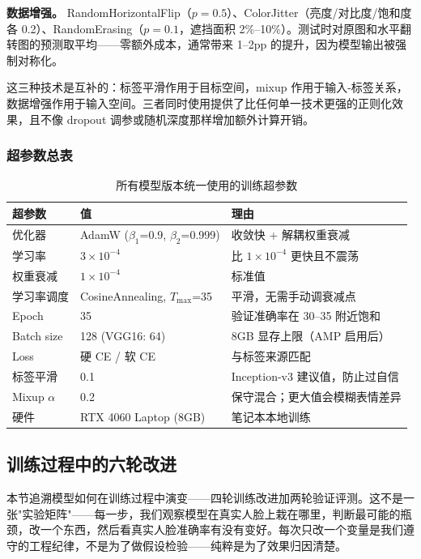 \documentclass[12pt,a4paper]{ctexart}
\begin{document}
\textbf{数据增强。} RandomHorizontalFlip（$p=0.5$）、ColorJitter（亮度/对比度/饱和度各 0.2）、RandomErasing（$p=0.1$，遮挡面积 2\%--10\%）。测试时对原图和水平翻转图的预测取平均——零额外成本，通常带来 1--2pp 的提升，因为模型输出被强制对称化。

这三种技术是互补的：标签平滑作用于目标空间，mixup 作用于输入-标签关系，数据增强作用于输入空间。三者同时使用提供了比任何单一技术更强的正则化效果，且不像 dropout 调参或随机深度那样增加额外计算开销。

\subsubsection{超参数总表}

\begin{table}[H]
\centering
\caption{所有模型版本统一使用的训练超参数}
\begin{tabular}{lll}
\toprule
超参数 & 值 & 理由 \\
\midrule
优化器    & AdamW ($\beta_1$=0.9, $\beta_2$=0.999) & 收敛快 + 解耦权重衰减 \\
学习率    & $3\times10^{-4}$ & 比 $1\times10^{-4}$ 更快且不震荡 \\
权重衰减  & $1\times10^{-4}$ & 标准值 \\
学习率调度 & CosineAnnealing, $T_{\max}$=35 & 平滑，无需手动调衰减点 \\
Epoch    & 35 & 验证准确率在 30--35 附近饱和 \\
Batch size & 128 (VGG16: 64) & 8GB 显存上限（AMP 启用后） \\
Loss     & 硬 CE / 软 CE & 与标签来源匹配 \\
标签平滑  & 0.1 & Inception-v3 建议值，防止过自信 \\
Mixup $\alpha$ & 0.2 & 保守混合；更大值会模糊表情差异 \\
硬件      & RTX 4060 Laptop (8GB) & 笔记本本地训练 \\
\bottomrule
\end{tabular}
\end{table}

\subsection{训练过程中的六轮改进}

本节追溯模型如何在训练过程中演变——四轮训练改进加两轮验证评测。这不是一张"实验矩阵"——每一步，我们观察模型在真实人脸上栽在哪里，判断最可能的瓶颈，改一个东西，然后看真实人脸准确率有没有变好。每次只改一个变量是我们遵守的工程纪律，不是为了做假设检验——纯粹是为了效果归因清楚。
\end{document}
